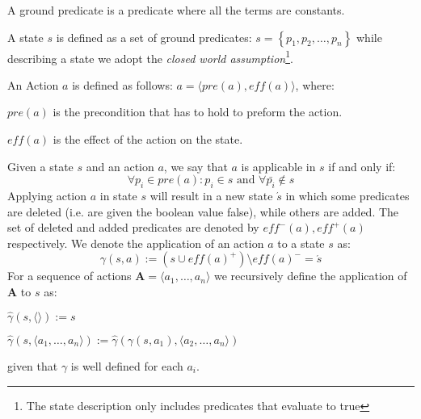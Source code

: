 \begin{Tdef}
    A ground predicate is a predicate where all the terms are constants.
\end{Tdef}
    
\begin{Tdef}[State]
    A state $s$ is defined as a set of ground predicates: $s = \left\{ p_1, p_2, \dots, p_n\right\}$
    while describing a state we adopt the \textit{closed world assumption}\footnote{The state description only includes predicates that evaluate to true}.
\end{Tdef}
    
\begin{Tdef}[Action]
    An Action $a$ is defined as follows: $a = \langle pre(a), eff(a) \rangle$, where:
    \vspace{-0.5em}
    \begin{compactitem}
    \item 
    $pre(a)$ is the precondition that has to hold to preform the action.
    \item 
    $eff(a)$ is the effect of the action on the state.
    \end{compactitem}
\end{Tdef}

\begin{Tdef}
    Given a state $s$ and an action $a$, we say that $a$ is applicable in $s$ 
    if and only if:
    \vspace{-0.5em}
    $$\forall p_i \in pre(a): p_i\in s \text{ and } \forall \bar{p_i} \notin s$$
    Applying action $a$ in state $s$ will result in a new state $\acute{s}$
    in which some predicates are deleted 
    (i.e. are given the boolean value false), while others are added.
    The set of deleted and added predicates are denoted by $eff^-(a), eff^+(a)$ respectively.
    We denote the application of an action $a$ to a state $s$ as:
    \vspace{-0.5em}
    $$\gamma(s,a) := (s \cup eff(a)^+) \setminus eff(a)^- = \acute{s}$$
    For a sequence of actions $\mathbf{A} = \langle a_1,\dots,a_n \rangle$ we recursively define 
    the application of $\mathbf{A}$ to $s$ as:
    \vspace{-0.5em}
    \begin{compactitem}
    \item 
    $\hat{\gamma}(s,\langle \rangle) := s$
    \item 
    $\hat{\gamma}(s,\langle a_1,\dots,a_n\rangle) := \hat{\gamma}(\gamma(s,a_1),\langle a_2,\dots,a_n\rangle)$
    \end{compactitem}
    given that $\gamma$ is well defined for each $a_i$.
\end{Tdef}



